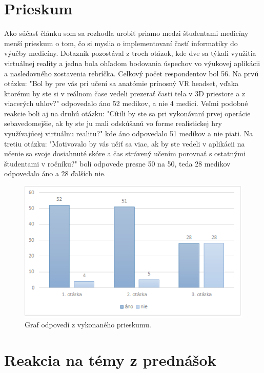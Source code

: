 \documentclass[10pt,twoside,slovak,a4paper]{article}
\begin{document}
\section{Prieskum} \label{prieskum}
Ako súčasť článku som sa rozhodla urobiť priamo medzi študentami medicíny menší prieskum o tom, čo si myslia o implementovaní častí informatiky do výučby medicíny. Dotazník pozostával z troch otázok, kde dve sa týkali využitia virtuálnej reality a jedna bola ohľadom bodovania úspechov vo výukovej aplikácii a nasledovného zostavenia rebríčka. Celkový počet respondentov bol 56. Na prvú otázku: "Bol by pre vás pri učení sa anatómie prínosný VR headset, vďaka ktorému by ste si v reálnom čase vedeli prezerať časti tela v 3D priestore a z viacerých uhlov?" odpovedalo áno 52 medikov, a nie 4 medici. Veľmi podobné reakcie boli aj na druhú otázku: "Cítili by ste sa pri vykonávaní prvej operácie sebavedomejšie, ak by ste ju mali odskúšanú vo forme realistickej hry využívajúcej virtuálnu realitu?" kde áno odpovedalo 51 medikov a nie piati. Na tretiu otázku: "Motivovalo by vás učiť sa viac, ak by ste vedeli v aplikácii na učenie sa svoje dosiahnuté skóre a čas strávený učením porovnať s ostatnými študentami v ročníku?" boli odpovede presne 50 na 50, teda 28 medikov odpovedalo áno a 28 ďalších nie.

\begin{figure}[tbh]
\centering
\includegraphics[scale=0.9]{graf.png}
\caption{Graf odpovedí z vykonaného prieskumu.}
\label{graf}
\end{figure}

\section{Reakcia na témy z prednášok} \label{prednasky}
\end{document}
